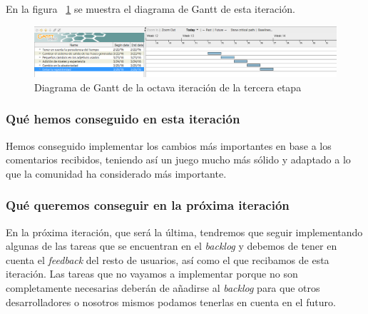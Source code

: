 En la figura ~\ref{fig:sec3it8} se muestra el diagrama de Gantt de esta iteración.

\begin{figure}
    \includegraphics[width=\textwidth,height=\textheight,keepaspectratio]{./img/sec3it8.png}
  \caption{Diagrama de Gantt de la octava iteración de la tercera etapa}
  \label{fig:sec3it8}
\end{figure}

\subsubsection{Qué hemos conseguido en esta iteración}

Hemos conseguido implementar los cambios más importantes en base a los comentarios recibidos, teniendo así un juego mucho más sólido y adaptado a lo que la comunidad ha considerado más importante.

\subsubsection{Qué queremos conseguir en la próxima iteración}

En la próxima iteración, que será la última, tendremos que seguir implementando algunas de las tareas que se encuentran en el \textit{backlog} y debemos de tener en cuenta el \textit{feedback} del resto de usuarios, así como el que recibamos de esta iteración.
Las tareas que no vayamos a implementar porque no son completamente necesarias deberán de añadirse al \textit{backlog} para que otros desarrolladores o nosotros mismos podamos tenerlas en cuenta en el futuro.